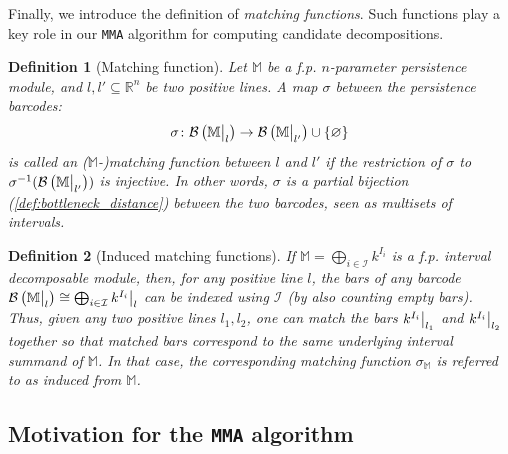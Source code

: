 \documentclass{article}
\newcommand{\barcode}[1]{ {\mathcal B}\left(#1\right) }
\newcommand{\matching}{\sigma}
\newcommand{\R}{\mathbb{R}}
\newcommand{\Mbb}{\mathbb{M}}
\newcommand\restr[2]{{  \left.\kern-\nulldelimiterspace #1 \vphantom{\big|} \right|_{#2}  }}
\newcommand{\MMA}{\texttt{MMA}}
\newcommand{\mmaout}{candidate}
\newtheorem{definition}{Definition}%
\newcommand{\rebuttal}[1]{{ #1}}
\begin{document}
\rebuttal{
Finally, we introduce the definition of {\em matching functions}. Such functions play a key role in our \MMA{} algorithm for computing \mmaout{} decompositions. \\


	\begin{definition}[Matching function]\label{def:barcode_matching}
		Let $\Mbb$ be a f.p. $n$-parameter persistence module, and $l, l'\subseteq \R^n$ be two positive lines. %
		A map $\matching$ between the persistence barcodes:
		\begin{equation*}
			\matching\colon
			\barcode{\restr{\Mbb}{l}}
			\rightarrow
			\barcode{\restr{\Mbb}{l'}}
			\cup \left\{ \varnothing\right\}
		\end{equation*}
		is called an ($\Mbb$-)\emph{matching function} between $l$ and $l'$ if the restriction of $\matching$ to $\matching^{-1}(\barcode{\restr{\Mbb}{l'}})$ is injective. %
		In other words, $\matching$ is a partial bijection (\cref{def:bottleneck_distance}) between the two barcodes, seen as multisets of intervals. \\
	\end{definition}
	
	
	\begin{definition}[Induced matching functions]
		\label{ex:exact_matching}
		If $\Mbb = \bigoplus_{i\in \mathcal I}k^{I_i}$ is a f.p. interval decomposable
		module, 
		then, for any positive line $l$,
		the bars of any barcode $\barcode{\restr \Mbb {l}} \cong \bigoplus_{ i \in \mathcal{I}} \restr
		{k^{{I_i}}} l$ can be indexed using $\mathcal{I}$ (by also counting empty bars).
		Thus, given any two positive lines $l_1,l_2$, one can match the bars $\restr {k^{I_i}}
		{l_1}$ and $\restr {k^{{I_i}}} {l_2}$ together so that matched bars
		correspond to the same underlying interval summand of $\Mbb$.
		In that case, the corresponding matching function $\sigma_{\Mbb}$ is referred to as \emph{induced from $\Mbb$}.
	\end{definition}
	
}

\subsection{Motivation for the \MMA{} algorithm} \label{subsec:motivation}
\end{document}
